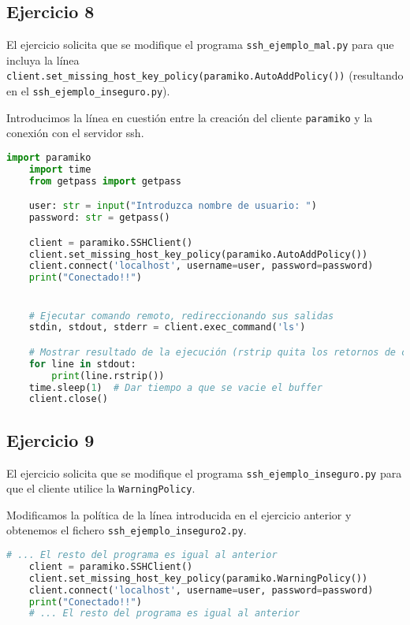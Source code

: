 \subsection{Ejercicio 8}

El ejercicio solicita que se modifique el programa \lstinline{ssh_ejemplo_mal.py}
para que incluya la línea \lstinline{client.set_missing_host_key_policy(paramiko.AutoAddPolicy())}
(resultando en el \lstinline{ssh_ejemplo_inseguro.py}).

Introducimos la línea en cuestión entre la creación del cliente \Verb#paramiko#
y la conexión con el servidor ssh.

\begin{lstlisting}[language=Python]
    import paramiko
    import time
    from getpass import getpass

    user: str = input("Introduzca nombre de usuario: ")
    password: str = getpass()

    client = paramiko.SSHClient()
    client.set_missing_host_key_policy(paramiko.AutoAddPolicy())
    client.connect('localhost', username=user, password=password)
    print("Conectado!!")


    # Ejecutar comando remoto, redireccionando sus salidas
    stdin, stdout, stderr = client.exec_command('ls')

    # Mostrar resultado de la ejecución (rstrip quita los retornos de carro)
    for line in stdout:
        print(line.rstrip())
    time.sleep(1)  # Dar tiempo a que se vacie el buffer
    client.close()
\end{lstlisting}

\subsection{Ejercicio 9}
El ejercicio solicita que se modifique el programa \lstinline{ssh_ejemplo_inseguro.py}
para que el cliente utilice la \Verb#WarningPolicy#.

Modificamos la política de la línea introducida en el ejercicio anterior y
obtenemos el fichero \lstinline{ssh_ejemplo_inseguro2.py}.

\begin{lstlisting}[language=Python]
    # ... El resto del programa es igual al anterior
    client = paramiko.SSHClient()
    client.set_missing_host_key_policy(paramiko.WarningPolicy())
    client.connect('localhost', username=user, password=password)
    print("Conectado!!")
    # ... El resto del programa es igual al anterior
\end{lstlisting}

